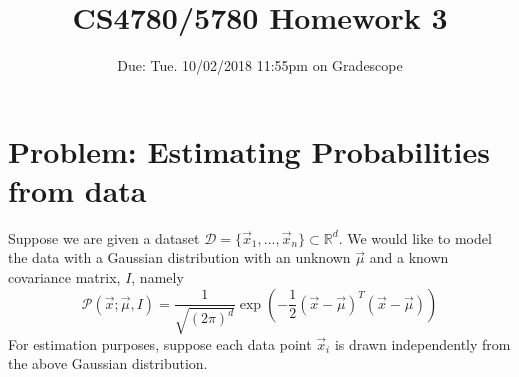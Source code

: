 \documentclass[11pt]{article}
\title{CS4780/5780 Homework 3}
\author{Due: Tue. 10/02/2018 11:55pm on Gradescope}
\date{}
\begin{document}
	
\maketitle

\section*{Problem: Estimating Probabilities from data}

Suppose we are given a dataset $\mathcal{D} = \{\vec{x}_1,  ..., \vec{x}_n\}\subset \mathbb{R}^d$. We would like to model the data with a Gaussian distribution with an unknown $\vec{\mu}$ and a known covariance matrix, $I$, namely  $$\mathcal{P}(\vec{x} ; \vec{\mu}, I) = \frac{1}{\sqrt{(2\pi)^{d}}} \exp (-\frac{1}{2} (\vec{x} - \vec{\mu})^T (\vec{x} - \vec{\mu}))$$
For estimation purposes, suppose each data point $\vec{x}_i$ is drawn independently from the above Gaussian distribution.
\end{document}

